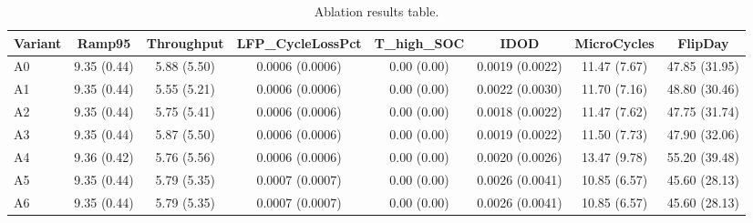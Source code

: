 \begin{table}[t]
\centering
\caption{Ablation results table.}
\label{tab:ablation_auto}
\begin{tabular}{lccccccc}
\toprule
Variant & Ramp95 & Throughput & LFP\_CycleLossPct & T\_high\_SOC & IDOD & MicroCycles & FlipDay \\
\midrule
A0 & 9.35 (0.44) & 5.88 (5.50) & 0.0006 (0.0006) & 0.00 (0.00) & 0.0019 (0.0022) & 11.47 (7.67) & 47.85 (31.95) \\
A1 & 9.35 (0.44) & 5.55 (5.21) & 0.0006 (0.0006) & 0.00 (0.00) & 0.0022 (0.0030) & 11.70 (7.16) & 48.80 (30.46) \\
A2 & 9.35 (0.44) & 5.75 (5.41) & 0.0006 (0.0006) & 0.00 (0.00) & 0.0018 (0.0022) & 11.47 (7.62) & 47.75 (31.74) \\
A3 & 9.35 (0.44) & 5.87 (5.50) & 0.0006 (0.0006) & 0.00 (0.00) & 0.0019 (0.0022) & 11.50 (7.73) & 47.90 (32.06) \\
A4 & 9.36 (0.42) & 5.76 (5.56) & 0.0006 (0.0006) & 0.00 (0.00) & 0.0020 (0.0026) & 13.47 (9.78) & 55.20 (39.48) \\
A5 & 9.35 (0.44) & 5.79 (5.35) & 0.0007 (0.0007) & 0.00 (0.00) & 0.0026 (0.0041) & 10.85 (6.57) & 45.60 (28.13) \\
A6 & 9.35 (0.44) & 5.79 (5.35) & 0.0007 (0.0007) & 0.00 (0.00) & 0.0026 (0.0041) & 10.85 (6.57) & 45.60 (28.13) \\
\bottomrule
\end{tabular}
\end{table}